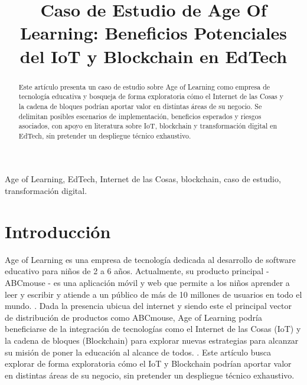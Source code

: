 \documentclass[conference]{IEEEtran}
\newcommand{\PaperTitle}{Caso de Estudio de Age Of Learning: Beneficios Potenciales del IoT y Blockchain en EdTech}
\begin{document}
\renewcommand{\abstractname}{Resumen}
\renewcommand{\IEEEkeywordsname}{Términos clave}
\renewcommand{\refname}{Referencias}

\title{\PaperTitle\\
}

\author{
}

\maketitle

\begin{abstract}
Este artículo presenta un caso de estudio sobre Age of Learning como empresa de tecnología educativa y bosqueja de forma exploratoria cómo el Internet de las Cosas y la cadena de bloques podrían aportar valor en distintas áreas de su negocio. Se delimitan posibles escenarios de implementación, beneficios esperados y riesgos asociados, con apoyo en literatura sobre IoT, blockchain y transformación digital en EdTech, sin pretender un despliegue técnico exhaustivo.
\end{abstract}

\begin{IEEEkeywords}
Age of Learning, EdTech, Internet de las Cosas, blockchain, caso de estudio, transformación digital.
\end{IEEEkeywords}

\section{Introducción}
Age of Learning es una empresa de tecnología dedicada al desarrollo de software educativo para niños de 2 a 6 años. Actualmente, su producto principal - ABCmouse - es una aplicación móvil y web que permite a los niños aprender a leer y escribir y atiende a un público de más de 10 millones de usuarios en todo el mundo. \cite{ageOfLearningWeb}.
Dada la presencia ubicua del internet y siendo este el principal vector de distribución de productos como ABCmouse, Age of Learning podría beneficiarse de la integración de tecnologías como el Internet de las Cosas (IoT) y la cadena de bloques (Blockchain) para explorar nuevas estrategias para alcanzar su misión de poner la educación al alcance de todos. \cite{sanchezRamoscelli2018iot}.
Este artículo busca explorar de forma exploratoria cómo el IoT y Blockchain podrían aportar valor en distintas áreas de su negocio, sin pretender un despliegue técnico exhaustivo.
\end{document}
